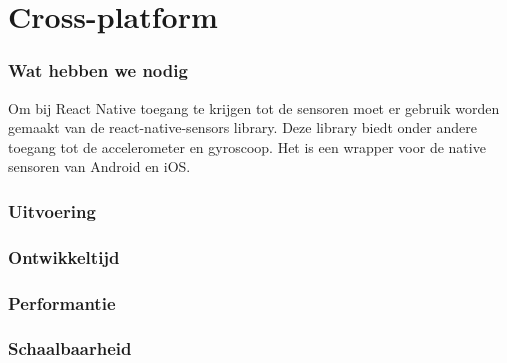 


\section{Cross-platform}
\subsubsection{Wat hebben we nodig}
Om bij React Native toegang te krijgen tot de sensoren moet er gebruik worden gemaakt van de react-native-sensors library.
Deze library biedt onder andere toegang tot de accelerometer en gyroscoop. Het is een wrapper voor de
native sensoren van Android en iOS. 

\subsubsection{Uitvoering}



\subsubsection{Ontwikkeltijd}



\subsubsection{Performantie}



\subsubsection{Schaalbaarheid}




